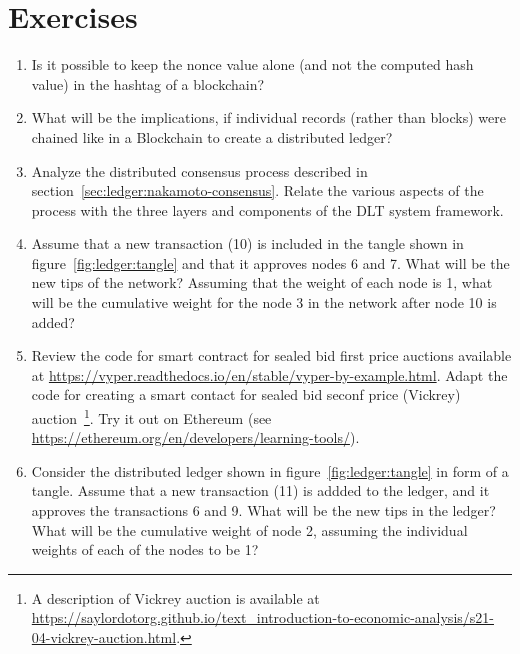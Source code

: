 \section*{Exercises}

\begin{enumerate}
	\item Is it possible to keep the nonce value alone (and not the computed hash value) in the hashtag of a 
		blockchain?
	\item What will be the implications, if individual records (rather than blocks) were chained like in a Blockchain
		to create a distributed ledger?
	\item Analyze the distributed consensus process described in section~\ref{sec:ledger:nakamoto-consensus}. Relate
		the various aspects of the process with the three layers and components of the DLT system framework.
	\item Assume that a new transaction (10) is included in the tangle shown in figure~\ref{fig:ledger:tangle} and
		that it approves nodes 6 and 7. What will be the new tips of the network? Assuming that the weight of each
		node is 1, what will be the cumulative weight for the node 3 in the network after node 10 is added?
	\item Review the code for smart contract for sealed bid first price auctions available at 
		\url{https://vyper.readthedocs.io/en/stable/vyper-by-example.html}. 
		Adapt the code for creating a smart contact for sealed bid seconf price (Vickrey) auction~\footnote{A description
		of Vickrey auction is available at 
		\url{https://saylordotorg.github.io/text\_introduction-to-economic-analysis/s21-04-vickrey-auction.html}.}.
		Try it out on Ethereum (see \url{https://ethereum.org/en/developers/learning-tools/}).
	\item Consider the distributed ledger shown in figure~\ref{fig:ledger:tangle} in form of a tangle. Assume that a new 
		transaction (11) is addded to the ledger, and it approves the transactions 6 and 9. What will be the new tips in 
		the ledger? What will be the cumulative weight of node 2, assuming the individual weights of each of the nodes to 
		be 1?
\end{enumerate}
